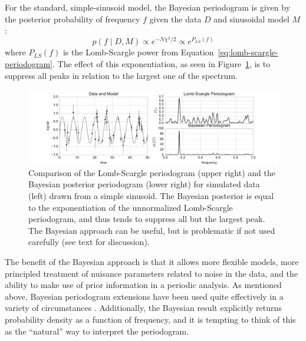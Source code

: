 \documentclass[preprint]{aastex}
\newcommand{\fig}[1]{Figure~\ref{fig:#1}}
\newcommand{\figlabel}[1]{\label{fig:#1}}
\newcommand{\Eq}[1]{Equation~\ref{eq:#1}}
\newcommand{\eq}[1]{\Eq{#1}}
\newcommand{\eqlabel}[1]{\label{eq:#1}}
\begin{document}
For the standard, simple-sinusoid model, the Bayesian periodogram is given by the posterior
probability of frequency $f$ given the data $D$ and sinusoidal model $M$:
\begin{equation}
  p(f\mid D, M) \propto e^{-N \chi^2 / 2} \propto e^{P_{LS}(f)}
  \eqlabel{bayesian-periodogram}
\end{equation}
where $P_{LS}(f)$ is the Lomb-Scargle power from \eq{lomb-scargle-periodogram}.
The effect of this exponentiation, as seen in \fig{bayesian-periodogram},
is to suppress all peaks in relation to the largest one of the spectrum.

\begin{figure}[ht]
  \centering
  \includegraphics[width=\textwidth]{fig24_bayesian_periodogram}
  \caption{Comparison of the Lomb-Scargle periodogram (upper right) and the
    Bayesian posterior periodogram (lower right) for simulated data (left)
    drawn from a simple sinusoid.
    The Bayesian posterior is equal to the exponentiation of the unnormalized
    Lomb-Scargle periodogram, and thus tends to suppress all but the largest
    peak. The Bayesian approach can be useful, but is problematic if
    not used carefully (see text for discussion).
    \figlabel{bayesian-periodogram}}
\end{figure}

The benefit of the Bayesian approach is that it allows more flexible models,
more principled treatment of nuisance parameters related to noise in the data,
and the ability to make use of prior information in a periodic analysis.
As mentioned above, Bayesian periodogram extensions have been used quite effectively in a
variety of circumstances \citep[see, e.g.][]{Bretthorst88}.
Additionally, the Bayesian result explicitly returns probability density as
a function of frequency, and it is tempting to think of this as the
``natural'' way to interpret the periodogram.
\end{document}
